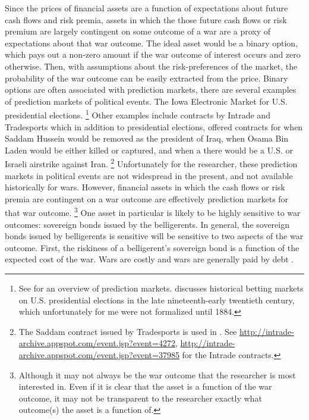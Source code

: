 Since the prices of financial assets are a function of expectations about future cash flows and risk premia, assets in which the those future cash flows or risk premium are largely contingent on some outcome of a war are a proxy of expectations about that war outcome.
The ideal asset would be a binary option, which pays out a non-zero amount if the war outcome of interest occurs and zero otherwise.
Then, with assumptions about the risk-preferences of the market, the probability of the war outcome can be easily extracted from the price.
Binary options are often associated with prediction markets, there are several examples of prediction markets of political events.
The Iowa Electronic Market for U.S. presidential elections.%
\footnote{
  See \textcite{WolfersZitzewitz2004} for an overview of prediction markets.
  \textcite{RhodeStrumpf2004a} discusses historical betting markets on U.S. presidential elections in the late nineteenth-early twentieth century, which unfortunately for me were not formalized until 1884.
}
Other examples include contracts by Intrade and Tradesports which in addition to presidential elections, offered contracts for when Saddam Hussein would be removed as the president of Iraq, when Osama Bin Laden would be either killed or captured, and when a there would be a U.S. or Israeli airstrike against Iran.%
\footnote{
  The Saddam contract issued by Tradesports is used in \textcite{LeighWolfersEtAl2003}.
  See \url{http://intrade-archive.appspot.com/event.jsp?event=4272}, \url{http://intrade-archive.appspot.com/event.jsp?event=37985} for the Intrade contracts.
}
Unfortunately for the researcher, these prediction markets in political events are not widespread in the present, and not available historically for wars.
However, financial assets in which the cash flows or risk premia are contingent on a war outcome are effectively prediction markets for that war outcome.%
\footnote{
  Although it may not always be the war outcome that the researcher is most interested in.
  Even if it is clear that the asset is a function of the war outcome, it may not be transparent to the researcher exactly what outcome(s) the asset is a function of.
}
One asset in particular is likely to be highly sensitive to war outcomes: sovereign bonds issued by the belligerents.
In general, the sovereign bonds issued by belligerents is sensitive will be sensitive to two aspects of the war outcome.
First, the riskiness of a belligerent's sovereign bond is a function of the expected cost of the war.
Wars are costly and wars are generally paid by debt \parencite{Slantchev2012a}.

